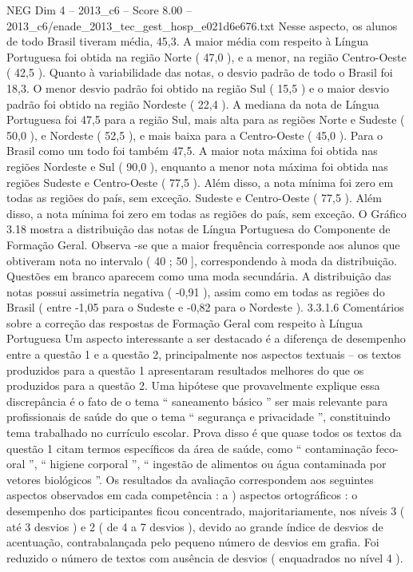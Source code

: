 \begin{textsample}{NEG Dim 4 – 2013\_c6 – Score 8.00 – 2013\_c6/enade\_2013\_tec\_gest\_hosp\_e021d6e676.txt}
Nesse aspecto, os alunos de todo Brasil tiveram média, 45,3.
A maior média com respeito à Língua Portuguesa foi obtida na região Norte ( 47,0 ), e a menor, na região Centro-Oeste ( 42,5 ).
Quanto à variabilidade das notas, o desvio padrão de todo o Brasil foi 18,3.
O menor desvio padrão foi obtido na região Sul ( 15,5 ) e o maior desvio padrão foi obtido na região Nordeste ( 22,4 ).
A mediana da nota de Língua Portuguesa foi 47,5 para a região Sul, mais alta para as regiões Norte e Sudeste ( 50,0 ), e Nordeste ( 52,5 ), e mais baixa para a Centro-Oeste ( 45,0 ).
Para o Brasil como um todo foi também 47,5.
A maior nota máxima foi obtida nas regiões Nordeste e Sul ( 90,0 ), enquanto a menor nota máxima foi obtida nas regiões Sudeste e Centro-Oeste ( 77,5 ).
Além disso, a nota mínima foi zero em todas as regiões do país, sem exceção.
Sudeste e Centro-Oeste ( 77,5 ).
Além disso, a nota mínima foi zero em todas as regiões do país, sem exceção.
O Gráfico 3.18 mostra a distribuição das notas de Língua Portuguesa do Componente de Formação Geral.
Observa -se que a maior frequência corresponde aos alunos que obtiveram nota no intervalo ( 40 ; 50 ], correspondendo à moda da distribuição.
Questões em branco aparecem como uma moda secundária.
A distribuição das notas possui assimetria negativa ( -0,91 ), assim como em todas as regiões do Brasil ( entre -1,05 para o Sudeste e -0,82 para o Nordeste ). 3.3.1.6 Comentários sobre a correção das respostas de Formação Geral com respeito à Língua Portuguesa Um aspecto interessante a ser destacado é a diferença de desempenho entre a questão 1 e a questão 2, principalmente nos aspectos textuais – os textos produzidos para a questão 1 apresentaram resultados melhores do que os produzidos para a questão 2.
Uma hipótese que provavelmente explique essa discrepância é o fato de o tema “ saneamento básico ” ser mais relevante para profissionais de saúde do que o tema “ segurança e privacidade ”, constituindo tema trabalhado no currículo escolar.
Prova disso é que quase todos os textos da questão 1 citam termos específicos da área de saúde, como “ contaminação feco-oral ”, “ higiene corporal ”, “ ingestão de alimentos ou água contaminada por vetores biológicos ”.
Os resultados da avaliação correspondem aos seguintes aspectos observados em cada competência : a ) aspectos ortográficos : o desempenho dos participantes ficou concentrado, majoritariamente, nos níveis 3 ( até 3 desvios ) e 2 ( de 4 a 7 desvios ), devido ao grande índice de desvios de acentuação, contrabalançada pelo pequeno número de desvios em grafia.
Foi reduzido o número de textos com ausência de desvios ( enquadrados no nível 4 ).

\end{textsample}
